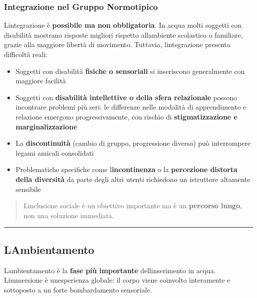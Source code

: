 \documentclass[a4paper,11pt]{article}
\providecommand{\tightlist}{%
  \setlength{\itemsep}{0pt}\setlength{\parskip}{0pt}}
\begin{document}
\subsubsection{Integrazione nel Gruppo
      Normotipico}\label{integrazione-nel-gruppo-normotipico}

L\textquotesingle integrazione è \textbf{possibile ma non obbligatoria}.
In acqua molti soggetti con disabilità mostrano risposte migliori
rispetto all\textquotesingle ambiente scolastico o familiare, grazie
alla maggiore libertà di movimento. Tuttavia,
l\textquotesingle integrazione presenta difficoltà reali:

\begin{itemize}
      \tightlist
      \item
            Soggetti con disabilità \textbf{fisiche o sensoriali} si inseriscono
            generalmente con maggiore facilità
      \item
            Soggetti con \textbf{disabilità intellettive o della sfera
                  relazionale} possono incontrare problemi più seri: le differenze nelle
            modalità di apprendimento e relazione emergono progressivamente, con
            rischio di \textbf{stigmatizzazione e marginalizzazione}
      \item
            La \textbf{discontinuità} (cambio di gruppo, progressione diversa) può
            interrompere legami amicali consolidati
      \item
            Problematiche specifiche come l\textquotesingle{}\textbf{incontinenza}
            o la \textbf{percezione distorta della diversità} da parte degli altri
            utenti richiedono un istruttore altamente sensibile
\end{itemize}

\begin{quote}
      L\textquotesingle inclusione sociale è un obiettivo importante ma è un
      \textbf{percorso lungo}, non una soluzione immediata.
\end{quote}

\begin{center}\rule{0.5\linewidth}{0.5pt}\end{center}

\subsection{L\textquotesingle Ambientamento}\label{lambientamento}

L\textquotesingle ambientamento è la \textbf{fase più importante}
dell\textquotesingle inserimento in acqua. L\textquotesingle immersione
è un\textquotesingle esperienza globale: il corpo viene coinvolto
interamente e sottoposto a un forte bombardamento sensoriale.
\end{document}
